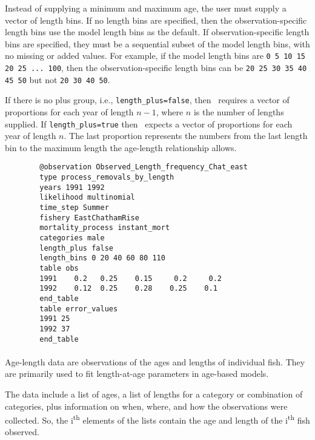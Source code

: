 Instead of supplying a minimum and maximum age, the user must supply a vector of length bins. If no length bins are specified, then the observation-specific length bins use the model length bins as the default. If observation-specific length bins are specified, they must be a sequential subset of the model length bins, with no missing or added values. For example, if the model length bins are \texttt{0 5 10 15 20 25 ... 100}, then the observation-specific length bins can be \texttt{20 25 30 35 40 45 50} but not \texttt{20 30 40 50}.

If there is no plus group, i.e., \texttt{length\_plus=false}, then \CNAME\ requires a vector of proportions for each year of length $n - 1$, where $n$ is the number of lengths supplied. If \texttt{length\_plus=true} then \CNAME\ expects a vector of proportions for each year of length $n$. The last proportion represents the numbers from the last length bin to the maximum length the age-length relationship allows.

{\small{\begin{verbatim}
		@observation Observed_Length_frequency_Chat_east
		type process_removals_by_length
		years 1991 1992
		likelihood multinomial
		time_step Summer
		fishery EastChathamRise
		mortality_process instant_mort
		categories male
		length_plus false
		length_bins 0 20 40 60 80 110
		table obs
		1991    0.2   0.25    0.15     0.2     0.2
		1992    0.12  0.25    0.28    0.25    0.1
		end_table
		table error_values
		1991 25
		1992 37
		end_table
		\end{verbatim}}}

\paragraph*{}\label{sec:Observation-AgeSize}
Age-length data are observations of the ages and lengths of individual fish. They are primarily used to fit length-at-age parameters in age-based models. 

The data include a list of ages, a list of lengths for a category or combination of categories, plus information on when, where, and how the observations were collected. So, the i\textsuperscript{th} elements of the lists contain the age and length of the i\textsuperscript{th} fish observed.

